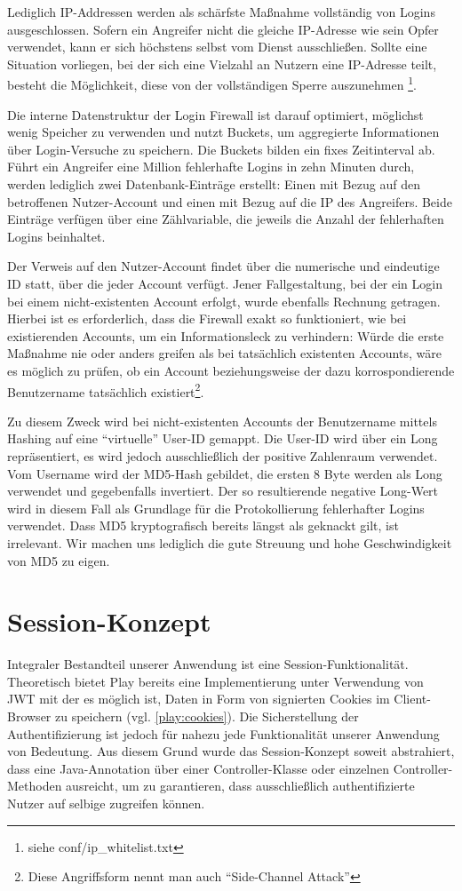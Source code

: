 \documentclass[12pt,DIV14,BCOR10mm,a4paper,parskip=half-,headsepline,headinclude,english,ngerman,bibliography=totocnumbered]{scrreprt}
\begin{document}
Lediglich IP-Addressen werden als schärfste Maßnahme vollständig von Logins ausgeschlossen. Sofern ein Angreifer nicht die gleiche IP-Adresse wie sein Opfer verwendet, kann er sich höchstens selbst vom Dienst ausschließen. Sollte eine Situation vorliegen, bei der sich eine Vielzahl an Nutzern eine IP-Adresse teilt, besteht die Möglichkeit, diese von der vollständigen Sperre auszunehmen \footnote{siehe conf/ip\_whitelist.txt}.

Die interne Datenstruktur der Login Firewall ist darauf optimiert, möglichst wenig Speicher zu verwenden und nutzt Buckets, um aggregierte Informationen über Login-Versuche zu speichern. Die Buckets bilden ein fixes Zeitinterval ab. Führt ein Angreifer eine Million fehlerhafte Logins in zehn Minuten durch, werden lediglich zwei Datenbank-Einträge erstellt: Einen mit Bezug auf den betroffenen Nutzer-Account und einen mit Bezug auf die IP des Angreifers. Beide Einträge verfügen über eine Zählvariable, die jeweils die Anzahl der fehlerhaften Logins beinhaltet.

Der Verweis auf den Nutzer-Account findet über die numerische und eindeutige ID statt, über die jeder Account verfügt. Jener Fallgestaltung, bei der ein Login bei einem nicht-existenten Account erfolgt, wurde ebenfalls Rechnung getragen. Hierbei ist es erforderlich, dass die Firewall exakt so funktioniert, wie bei existierenden Accounts, um ein Informationsleck zu verhindern: Würde die erste Maßnahme nie oder anders greifen als bei tatsächlich existenten Accounts, wäre es möglich zu prüfen, ob ein Account beziehungsweise der dazu korrospondierende Benutzername tatsächlich existiert\footnote{Diese Angriffsform nennt man auch \enquote{Side-Channel Attack}}.

Zu diesem Zweck wird bei nicht-existenten Accounts der Benutzername mittels Hashing auf eine \enquote{virtuelle} User-ID gemappt. Die User-ID wird über ein Long repräsentiert, es wird jedoch ausschließlich der positive Zahlenraum verwendet. Vom Username wird der MD5-Hash gebildet, die ersten 8 Byte werden als Long verwendet und gegebenfalls invertiert. Der so resultierende negative Long-Wert wird in diesem Fall als Grundlage für die Protokollierung fehlerhafter Logins verwendet. Dass MD5 kryptografisch bereits längst als geknackt gilt, ist irrelevant. Wir machen uns lediglich die gute Streuung und hohe Geschwindigkeit von MD5 zu eigen.

\section{Session-Konzept}
\label{sessionkonzept}
Integraler Bestandteil unserer Anwendung ist eine Session-Funktionalität. Theoretisch bietet Play bereits eine Implementierung unter Verwendung von JWT mit der es möglich ist, Daten in Form von signierten Cookies im Client-Browser zu speichern (vgl. \ref{play:cookies}). Die Sicherstellung der Authentifizierung ist jedoch für nahezu jede Funktionalität unserer Anwendung von Bedeutung. Aus diesem Grund wurde das Session-Konzept soweit abstrahiert, dass eine Java-Annotation über einer Controller-Klasse oder einzelnen Controller-Methoden ausreicht, um zu garantieren, dass ausschließlich authentifizierte Nutzer auf selbige zugreifen können.
\end{document}
